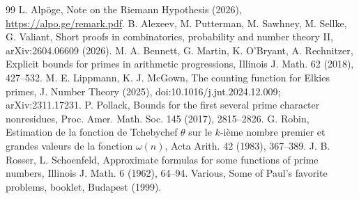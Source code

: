 \documentclass[11pt]{amsart}
\theoremstyle{remark}\newtheorem*{remark}{Remark}
\begin{document}
\begin{thebibliography}{99}
 L. Alp\"oge, Note on the Riemann Hypothesis (2026), \url{https://alpo.ge/remark.pdf}.
 B. Alexeev, M. Putterman, M. Sawhney, M. Sellke, G. Valiant, Short proofs in combinatorics, probability and number theory II, arXiv:2604.06609 (2026).
 M. A. Bennett, G. Martin, K. O'Bryant, A. Rechnitzer, Explicit bounds for primes in arithmetic progressions, Illinois J. Math. 62 (2018), 427--532.
 M. E. Lippmann, K. J. McGown, The counting function for Elkies primes, J. Number Theory (2025), doi:10.1016/j.jnt.2024.12.009; arXiv:2311.17231.
 P. Pollack, Bounds for the first several prime character nonresidues, Proc. Amer. Math. Soc. 145 (2017), 2815--2826.
 G. Robin, Estimation de la fonction de Tchebychef $\theta$ sur le $k$-i\`eme nombre premier et grandes valeurs de la fonction $\omega(n)$, Acta Arith. 42 (1983), 367--389.
 J. B. Rosser, L. Schoenfeld, Approximate formulas for some functions of prime numbers, Illinois J. Math. 6 (1962), 64--94.
 Various, Some of Paul's favorite problems, booklet, Budapest (1999).
\end{thebibliography}
\end{document}
